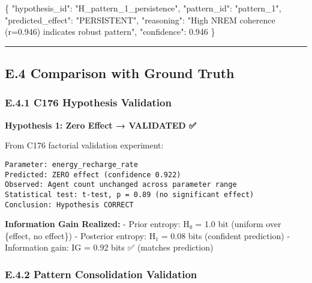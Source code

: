 \documentclass[
]{article}
\newenvironment{Shaded}{}{}
\newcommand{\DataTypeTok}[1]{\textcolor[rgb]{0.56,0.13,0.00}{#1}}
\newcommand{\FloatTok}[1]{\textcolor[rgb]{0.25,0.63,0.44}{#1}}
\newcommand{\FunctionTok}[1]{\textcolor[rgb]{0.02,0.16,0.49}{#1}}
\newcommand{\StringTok}[1]{\textcolor[rgb]{0.25,0.44,0.63}{#1}}
\begin{document}
\begin{Shaded}
\begin{Highlighting}[]
\FunctionTok{\{}
  \DataTypeTok{"hypothesis\_id"}\FunctionTok{:} \StringTok{"H\_pattern\_1\_persistence"}\FunctionTok{,}
  \DataTypeTok{"pattern\_id"}\FunctionTok{:} \StringTok{"pattern\_1"}\FunctionTok{,}
  \DataTypeTok{"predicted\_effect"}\FunctionTok{:} \StringTok{"PERSISTENT"}\FunctionTok{,}
  \DataTypeTok{"reasoning"}\FunctionTok{:} \StringTok{"High NREM coherence (r=0.946) indicates robust pattern"}\FunctionTok{,}
  \DataTypeTok{"confidence"}\FunctionTok{:} \FloatTok{0.946}
\FunctionTok{\}}
\end{Highlighting}
\end{Shaded}

\begin{center}\rule{0.5\linewidth}{0.5pt}\end{center}

\subsection{E.4 Comparison with Ground
Truth}\label{e.4-comparison-with-ground-truth}

\subsubsection{E.4.1 C176 Hypothesis
Validation}\label{e.4.1-c176-hypothesis-validation}

\textbf{Hypothesis 1: Zero Effect → VALIDATED ✅}

From C176 factorial validation experiment:

\begin{verbatim}
Parameter: energy_recharge_rate
Predicted: ZERO effect (confidence 0.922)
Observed: Agent count unchanged across parameter range
Statistical test: t-test, p = 0.89 (no significant effect)
Conclusion: Hypothesis CORRECT
\end{verbatim}

\textbf{Information Gain Realized:} - Prior entropy: H₀ = 1.0 bit
(uniform over \{effect, no effect\}) - Posterior entropy: H₁ = 0.08 bits
(confident prediction) - Information gain: IG = 0.92 bits ✅ (matches
prediction)

\subsubsection{E.4.2 Pattern Consolidation
Validation}\label{e.4.2-pattern-consolidation-validation}
\end{document}
